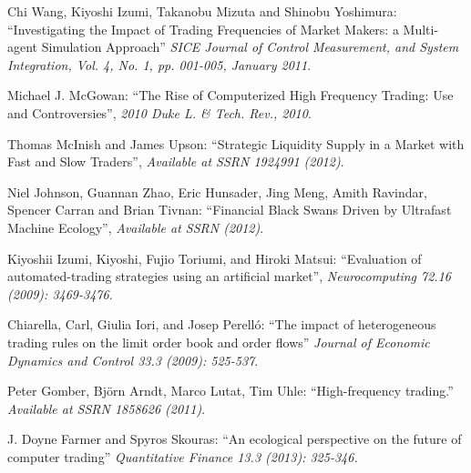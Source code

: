 \documentclass[11pt, a4paper, oneside]{Thesis} %
\begin{document}
\label{Bibliography}




\begin{thebibliography}{99}



 Chi Wang, Kiyoshi Izumi, Takanobu Mizuta and Shinobu Yoshimura:
``Investigating the Impact of Trading Frequencies of Market Makers: a Multi-agent Simulation Approach''
 \textit{SICE Journal of Control Measurement, and System Integration, Vol. 4, No. 1, pp. 001-005, January 2011}.

 Michael J. McGowan:
``The Rise of Computerized High Frequency Trading: Use and Controversies'',
\textit{2010 Duke L. \& Tech. Rev., 2010}.

 Thomas McInish and James Upson:
``Strategic Liquidity Supply in a Market with Fast and Slow Traders'',
\textit{Available at SSRN 1924991 (2012)}.

 Niel Johnson, Guannan Zhao, Eric Hunsader, Jing Meng, Amith Ravindar, Spencer Carran and Brian Tivnan: 
``Financial Black Swans Driven by Ultrafast Machine Ecology'', \textit{Available at SSRN (2012)}.

Kiyoshii Izumi, Kiyoshi, Fujio Toriumi, and Hiroki Matsui: ``Evaluation of automated-trading strategies using an artificial market'', \textit{Neurocomputing 72.16 (2009): 3469-3476}.

Chiarella, Carl, Giulia Iori, and Josep Perelló:
``The impact of heterogeneous trading rules on the limit order book and order flows''
\textit{Journal of Economic Dynamics and Control 33.3 (2009): 525-537}.

Peter Gomber, Björn Arndt, Marco Lutat, Tim Uhle:
``High-frequency trading.'' 
\textit{Available at SSRN 1858626 (2011)}.

J. Doyne Farmer and Spyros Skouras:
``An ecological perspective on the future of computer trading''
\textit{Quantitative Finance 13.3 (2013): 325-346.}

\end{thebibliography}
\end{document}
